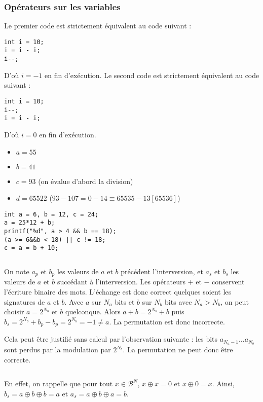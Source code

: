 \documentclass[../main.tex]{subfiles}
\begin{document}
\subsubsection{Opérateurs sur les variables}
 
Le premier code est strictement équivalent au code suivant :
\begin{verbatim}
int i = 10;
i = i - i;
i--;
\end{verbatim}
D'où $i = -1$ en fin d'exécution. 
Le second code est strictement équivalent au code suivant :
\begin{verbatim}
int i = 10;
i--;
i = i - i;
\end{verbatim}
D'où $i = 0$ en fin d'exécution.
 
\begin{itemize}
	\item $a = 55$
	\item $b = 41$
	\item $c = 93$ (on évalue d'abord la division)
	\item $d = 65522$ ($93 - 107 = 0 - 14 \equiv 65535 - 13 [65536]$)
\end{itemize}
\begin{verbatim}
int a = 6, b = 12, c = 24;
a = 25*12 + b;
printf("%d", a > 4 && b == 18);
(a >= 6&&b < 18) || c != 18;
c = a = b + 10;
\end{verbatim}
\inputminted{c}{solutions/part2/chapter2/inter_no_side_effect_1.c}
On note $a_{p}$ et $b_{p}$ les valeurs de $a$ et $b$ précédent l'interversion, et $a_{s}$ et $b_{s}$ les valeurs de $a$ et $b$ succédant à l'interversion.  
Les opérateurs $+$ et $-$ conservent l'écriture binaire des mots. L'échange est donc correct quelques soient les signatures de $a$ et $b$. 
Avec $a$ sur $N_{a}$ bits et $b$ sur $N_{b}$ bits avec $N_{a} > N_{b}$, on peut choisir $a = 2^{N_{b}}$ et $b$ quelconque. Alors $a + b = 2^{N_{b}}+b$ puis $b_{s} = 2^{N_{b}}+b_{p} - b_{p} = 2^{N_{b}} = -1 \neq{a}$. La permutation est donc incorrecte.
 
Cela peut être justifié sans calcul par l'observation suivante : les bits $a_{N_{a}-1}\dots a_{N_b}$ sont perdus par la modulation par $2^{N_{b}}$. La permutation ne peut donc être correcte.
 
\inputminted{c}{solutions/part2/chapter2/inter_no_side_effect_2.c}
En effet, on rappelle que pour tout ${x\in{\mathcal{B}^{N}}}$, $x\oplus{x} = 0$ et $x\oplus{0} = x$. Ainsi, $b_{s} = a\oplus{b}\oplus{b} = a$ et $a_{s} = a\oplus{b}\oplus{a} = b$.
 
\end{document}
